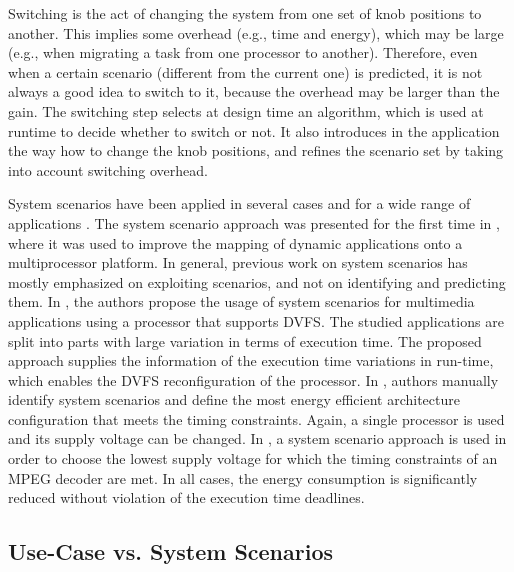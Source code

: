 \begin{enumerate}
Switching is the act of changing the system from one set of knob positions to another. This implies some overhead (e.g., time and energy), which may be large (e.g., when migrating a task from one processor to another). 
Therefore, even when a certain scenario (different from the current one) is predicted, it is not always a good idea to switch to it, because the overhead may be larger than the gain. The switching step selects at design time an algorithm, which is used at runtime to decide whether to switch or not. 
It also introduces in the application the way how to change the knob positions, and refines the scenario set by taking into account switching overhead.

\end{enumerate}

System scenarios have been applied in several cases and for a wide range of applications \cite{tcm}.
The system scenario approach was presented for the first time in \cite{yang2002}, where it was used to improve the mapping of dynamic applications onto a multiprocessor platform.
In general, previous work on system scenarios has mostly emphasized on exploiting scenarios, and not on identifying and predicting them. 
In \cite{Chu02}, the authors propose the usage of system scenarios for multimedia applications using a processor that supports DVFS. 
The studied applications are split into parts with large variation in terms of execution time. 
The proposed approach supplies the information of the execution time variations in run-time, which enables the DVFS reconfiguration of the processor.
In \cite{sasanka2002}, authors manually identify system scenarios and define the most energy efficient architecture configuration that meets the timing constraints. 
Again, a single processor is used and its supply voltage can be changed. 
In \cite{choi2002}, a system scenario approach is used in order to choose the lowest supply voltage for which the timing constraints of an MPEG decoder are met. 
In all cases, the energy consumption is significantly reduced without violation of the execution time deadlines.


\subsection{Use-Case vs. System Scenarios}

